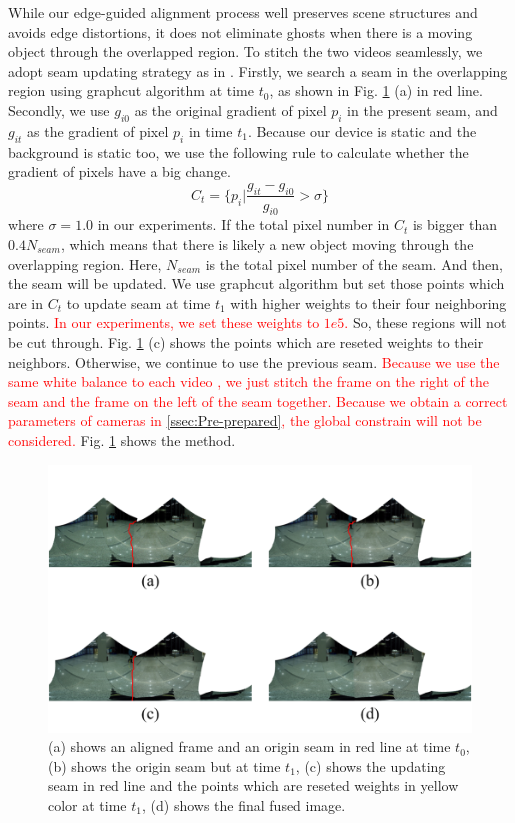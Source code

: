 \documentclass[conference]{IEEEtran}
\begin{document}
While our edge-guided alignment process well preserves scene structures and avoids edge distortions, it does not eliminate ghosts when there is a moving object through the overlapped region.
To stitch the two videos seamlessly, we adopt seam updating strategy as in \cite{he2016parallax}. 
Firstly, we search a seam in the overlapping region using graphcut algorithm \cite{boykov2004experimental} at time $t_0$, as shown in Fig. \ref{fig:p24} (a) in red line.
Secondly, we use $g_{i0}$ as the original gradient of pixel $p_i$ in the present seam, and $g_{it}$ as the gradient of pixel $p_i$ in time $t_1$. 
Because our device is static and the background is static too, we use the following rule to calculate whether the gradient
of pixels have a big change.
\begin{equation}
\textit{C}_{t}=\{p_{i}|\frac{g_{it}-g_{i0}}{g_{i0}}>\sigma\}
\end{equation}
where $\sigma=1.0$ in our experiments.
If the total pixel number in $\textit{C}_t$ is bigger than $0.4N_{seam}$, which means that there is likely a new object moving through the overlapping region. 
Here, $N_{seam}$ is the total pixel number of the seam. 
And then, the seam will be updated. We use graphcut algorithm but set those points which are in $C_t$ to update seam at time $t_1$ with higher weights to their four neighboring points. 
\textcolor{red}{In our experiments, we set these weights to $1e5$.}
So, these regions will not be cut through.
Fig. \ref{fig:p24} (c) shows the points which are reseted weights to their neighbors.
Otherwise, we continue to use the previous seam.
\textcolor{red}{Because we use the same white balance to each video , we just stitch the frame on the right of the seam and the frame on the left of the seam together.}
\textcolor{red}{Because we obtain a correct parameters of cameras in \ref{ssec:Pre-prepared}, the global constrain will not be considered.}
Fig. \ref{fig:p24} shows the method.
\begin{figure}[h]
\centering
\includegraphics[scale=0.52]{picture58.png}
\caption{(a) shows an aligned frame and an origin seam in red line at time $t_0$, (b) shows the origin seam but at time $t_1$, 
(c) shows the updating seam in red line and the points which are reseted weights in yellow color at time $t_1$, (d) shows the final fused image.}
\label{fig:p24}
\end{figure}
\end{document}
